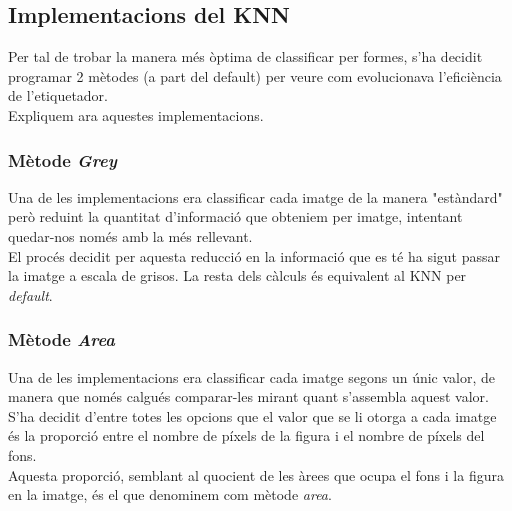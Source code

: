 \documentclass[a4paper, 11pt]{article}
\begin{document}
\subsection{Implementacions del KNN}
Per tal de trobar la manera més òptima de classificar per formes, s'ha decidit programar 2 mètodes (a part del default) per veure com evolucionava l'eficiència de l'etiquetador.\\
Expliquem ara aquestes implementacions.\\
\subsubsection{Mètode \textit{Grey}}
Una de les implementacions era classificar cada imatge de la manera "estàndard" \hspace{0.250em}però reduint la quantitat d'informació que obteniem per imatge, intentant quedar-nos només amb la més rellevant.\\
El procés decidit per aquesta reducció en la informació que es té ha sigut passar la imatge a escala de grisos. La resta dels càlculs és equivalent al KNN per \textit{default}.\\

\subsubsection{Mètode \textit{Area}}
Una de les implementacions era classificar cada imatge segons un únic valor, de manera que només calgués comparar-les mirant quant s'assembla aquest valor.\\
S'ha decidit d'entre totes les opcions que el valor que se li otorga a cada imatge és la proporció entre el nombre de píxels de la figura i el nombre de píxels del fons.\\
Aquesta proporció, semblant al quocient de les àrees que ocupa el fons i la figura en la imatge, és el que denominem com mètode \textit{area}.\\
\newpage
\end{document}
